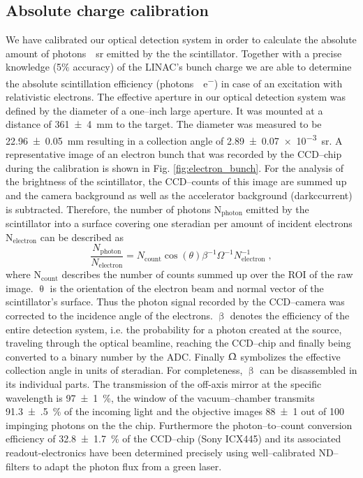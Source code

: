 \documentclass[%
preprint,
amsmath,
amssymb,
aip,
rsi, 
numerical,
floatfix,
]{revtex4-1}
\begin{document}
\subsection{\label{Ac} Absolute charge calibration}
We have calibrated our optical detection system in order to calculate the absolute amount of \si[per-mode=symbol]{photons \per \steradian}  emitted by the the scintillator.
Together with a precise knowledge (5$\%$ accuracy) of the LINAC's bunch charge we are able to determine the absolute scintillation efficiency (\si[per-mode=symbol]{photons \per e^-}) in case of an excitation with relativistic electrons.
The effective aperture in our optical detection system was defined by the diameter of a one--inch large aperture.
It was mounted at a distance of \SI[separate-uncertainty = true]{361(4)}{\milli\metre} to the target.
The diameter was measured to be \SI[separate-uncertainty = true]{22.96(5)}{\milli\metre} resulting in a collection angle of \SI[separate-uncertainty = true]{2.89(7)e-3}{\steradian}.
A representative image of an electron bunch that was recorded by the CCD--chip during the calibration is shown in Fig. \ref{fig:electron_bunch}. For the analysis of the brightness of the scintillator, the CCD--counts of this image are summed up and the camera background as well as the accelerator background (darkccurrent) is subtracted. 
Therefore, the number of photons N$_{\text{photon}}$ emitted by the scintillator into a surface covering one steradian per amount of incident electrons N$_{\text{electron}}$ can be described as
\begin{equation}
\frac{N_{\text{photon}}}{N_{\text{electron}}} = N_{\text{count}}\cos(\theta)\beta^{-1}\Omega^{-1}N_{\text{electron}}^{-1}{\;,}
\label{eq:ac}
\end{equation}
where N$_{\text{count}}$ describes the number of counts summed up over the ROI of the raw image.
$\uptheta$ is the orientation of the electron beam and normal vector of the scintillator's surface.
Thus the photon signal recorded by the CCD--camera was corrected to the incidence angle of the electrons.
$\upbeta$ denotes the efficiency of the entire detection system, i.e. the probability for a photon created at the source, traveling through the optical beamline, reaching the CCD--chip and finally being converted to a binary number by the ADC.
Finally $\Upomega$ symbolizes the effective collection angle in units of steradian.
For completeness, $\upbeta$ can be disassembled in its individual parts. 
The transmission of the off-axis mirror at the specific wavelength is \SI[separate-uncertainty = true]{97(1)}{\%}, the window of the vacuum--chamber transmits \SI[separate-uncertainty = true]{91.3(5)}{\%} of the incoming light and the objective images \num[separate-uncertainty = true]{88(1)} out of 100 impinging photons on the the chip.
Furthermore the photon--to--count conversion efficiency of \SI[separate-uncertainty = true]{32.8(17)}{\%} of the CCD--chip (Sony ICX445) and its associated readout-electronics have been determined precisely using well--calibrated ND--filters to adapt the photon flux from a green laser.  
\end{document}
